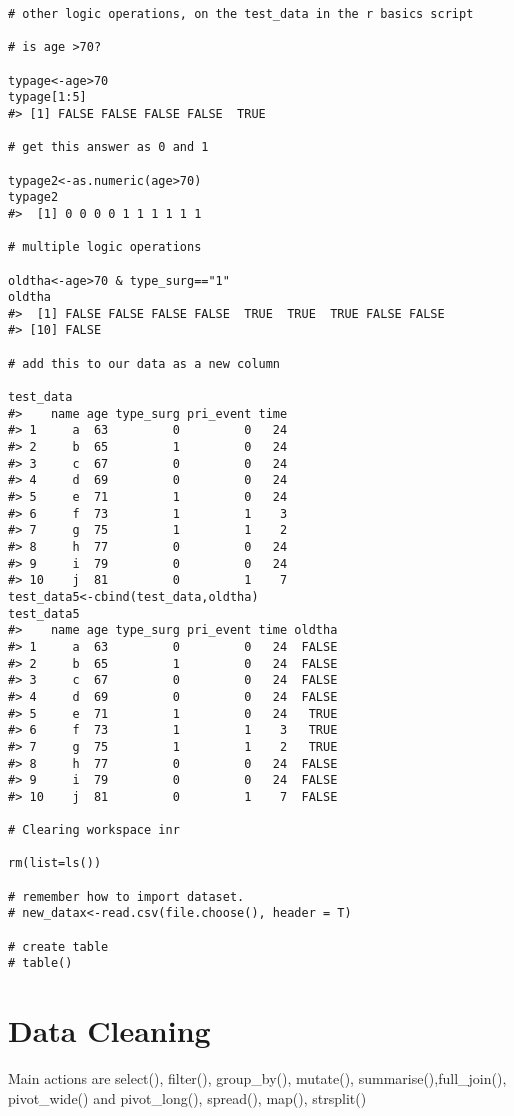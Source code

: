 \documentclass[
]{article}
\begin{document}
\begin{verbatim}
# other logic operations, on the test_data in the r basics script

# is age >70?

typage<-age>70
typage[1:5]
#> [1] FALSE FALSE FALSE FALSE  TRUE

# get this answer as 0 and 1

typage2<-as.numeric(age>70)
typage2  
#>  [1] 0 0 0 0 1 1 1 1 1 1

# multiple logic operations

oldtha<-age>70 & type_surg=="1"
oldtha
#>  [1] FALSE FALSE FALSE FALSE  TRUE  TRUE  TRUE FALSE FALSE
#> [10] FALSE

# add this to our data as a new column

test_data
#>    name age type_surg pri_event time
#> 1     a  63         0         0   24
#> 2     b  65         1         0   24
#> 3     c  67         0         0   24
#> 4     d  69         0         0   24
#> 5     e  71         1         0   24
#> 6     f  73         1         1    3
#> 7     g  75         1         1    2
#> 8     h  77         0         0   24
#> 9     i  79         0         0   24
#> 10    j  81         0         1    7
test_data5<-cbind(test_data,oldtha)
test_data5
#>    name age type_surg pri_event time oldtha
#> 1     a  63         0         0   24  FALSE
#> 2     b  65         1         0   24  FALSE
#> 3     c  67         0         0   24  FALSE
#> 4     d  69         0         0   24  FALSE
#> 5     e  71         1         0   24   TRUE
#> 6     f  73         1         1    3   TRUE
#> 7     g  75         1         1    2   TRUE
#> 8     h  77         0         0   24  FALSE
#> 9     i  79         0         0   24  FALSE
#> 10    j  81         0         1    7  FALSE

# Clearing workspace inr

rm(list=ls())

# remember how to import dataset.
# new_datax<-read.csv(file.choose(), header = T)

# create table
# table()
\end{verbatim}

\hypertarget{data-cleaning}{%
\section{Data Cleaning}\label{data-cleaning}}

Main actions are select(), filter(), group\_by(), mutate(), summarise(),full\_join(), pivot\_wide() and pivot\_long(), spread(), map(), strsplit()
\end{document}
